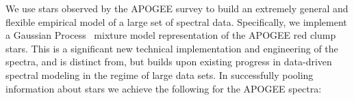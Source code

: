 \documentclass[a4paper,fleqn,usenatbib]{mnras}
\begin{document}
 We use stars observed by the APOGEE survey to build an extremely
 general and flexible empirical model of a large set of spectral data.
Specifically, we implement a Gaussian Process~\citep{Rasmussen_Williams} mixture model representation of the APOGEE red clump stars. This is a significant new technical implementation and engineering of the spectra, and is distinct from, but builds upon existing progress in data-driven spectral modeling in the regime of large data sets. %
In successfully pooling information about stars we achieve the following for the APOGEE spectra:
\end{document}
